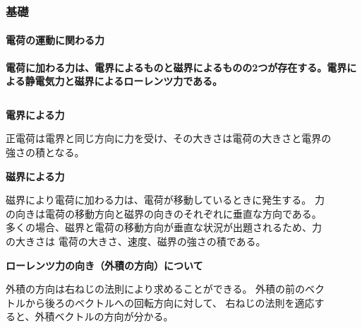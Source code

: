 \documentclass[dvipdfmx, 8pt, aspectratio=169]{beamer}
\begin{document}
\begin{frame}[t]
  \frametitle{基礎}
  \framesubtitle{電荷の運動に関わる力}

  \textcolor{mri-blue}{
  \textbf{電荷に加わる力は、電界によるものと磁界によるものの2つが存在する。電界による静電気力と磁界によるローレンツ力である。
  \vspace{1zh}
  }
  }

  \begin{columns}[t]
    \centering

    \begin{column}{0.55\textwidth}
      \textbf{電界による力}
      \vspace{1ex}

      正電荷は電界と同じ方向に力を受け、その大きさは電荷の大きさと電界の強さの積となる。
      \vspace{1zh}

      \textbf{磁界による力}
      \vspace{1ex}

      磁界により電荷に加わる力は、電荷が移動しているときに発生する。
      力の向きは電荷の移動方向と磁界の向きのそれぞれに垂直な方向である。
      多くの場合、磁界と電荷の移動方向が垂直な状況が出題されるため、力の大きさは
      電荷の大きさ、速度、磁界の強さの積である。
      \vspace{1zh}

      \textbf{ローレンツ力の向き（外積の方向）について}
      \vspace{1ex}

      外積の方向は右ねじの法則により求めることができる。
      外積の前のベクトルから後ろのベクトルへの回転方向に対して、      右ねじの法則を適応すると、外積ベクトルの方向が分かる。

    \end{column}

    \begin{column}{0.4\textwidth}
      \begin{figure}[t]
        \centering
\end{figure}
\end{column}
\end{columns}
\end{frame}
\end{document}
